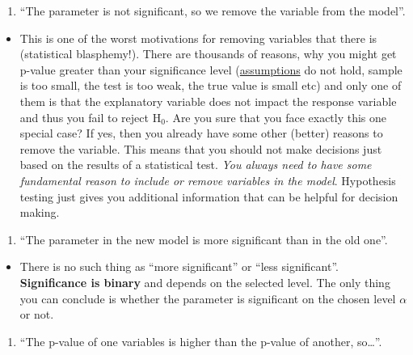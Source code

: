 \documentclass[
]{book}
\providecommand{\tightlist}{%
  \setlength{\itemsep}{0pt}\setlength{\parskip}{0pt}}
\theoremstyle{definition}
\theoremstyle{definition}
\theoremstyle{definition}
\theoremstyle{definition}
\theoremstyle{remark}
\begin{document}
\begin{enumerate}
\def\labelenumi{\arabic{enumi}.}
\setcounter{enumi}{5}
\tightlist
\item
  ``The parameter is not significant, so we remove the variable from the model''.
\end{enumerate}

\begin{itemize}
\tightlist
\item
  This is one of the worst motivations for removing variables that there is (statistical blasphemy!). There are thousands of reasons, why you might get p-value greater than your significance level (\hyperref[assumptions]{assumptions} do not hold, sample is too small, the test is too weak, the true value is small etc) and only one of them is that the explanatory variable does not impact the response variable and thus you fail to reject \(\mathrm{H}_0\). Are you sure that you face exactly this one special case? If yes, then you already have some other (better) reasons to remove the variable. This means that you should not make decisions just based on the results of a statistical test. \emph{You always need to have some fundamental reason to include or remove variables in the model}. Hypothesis testing just gives you additional information that can be helpful for decision making.
\end{itemize}

\begin{enumerate}
\def\labelenumi{\arabic{enumi}.}
\setcounter{enumi}{6}
\tightlist
\item
  ``The parameter in the new model is more significant than in the old one''.
\end{enumerate}

\begin{itemize}
\tightlist
\item
  There is no such thing as ``more significant'' or ``less significant''. \textbf{Significance is binary} and depends on the selected level. The only thing you can conclude is whether the parameter is significant on the chosen level \(\alpha\) or not.
\end{itemize}

\begin{enumerate}
\def\labelenumi{\arabic{enumi}.}
\setcounter{enumi}{7}
\tightlist
\item
  ``The p-value of one variables is higher than the p-value of another, so\ldots{}''.
\end{enumerate}
\end{document}
